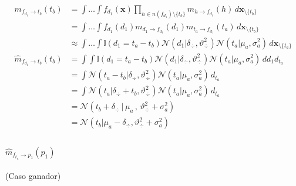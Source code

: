 \documentclass[11pt,twoside,spanish]{report} %
\begin{document}
\begin{equation}\label{eq:^m_fd_tb}
	\begin{split}
		m_{f_{d_1} \rightarrow t_b}(t_b) & = \int \dots \int f_{d_1}(\textbf{x}) \prod_{h \in n(f_{d_1}) \setminus \{t_b\} } m_{h \rightarrow f_{d_1}}(h) \, d\textbf{x}_{\setminus \{t_b\}} \\
		& = \int \dots \int f_{d_1}(d_1)  m_{d_1 \rightarrow f_{d_1}}(d_1) m_{t_a \rightarrow f_{d_1}}(t_a) \, d\textbf{x}_{\setminus \{t_b\}} \\
		&\approx  \int \dots \int \mathbb{I}(d_1 = t_a - t_b) \mathcal{N}(d_1 | \delta_{\div}, \vartheta_{\div}^2) \mathcal{N}(t_a | \mu_a , \sigma_a^2 )  \, d\textbf{x}_{\setminus \{t_a\} } \\
		\widehat{m}_{f_{d_1} \rightarrow t_b}(t_b)  & = \int \int \mathbb{I}(d_1 = t_a - t_b) \mathcal{N}(d_1 | \delta_{\div}, \vartheta_{\div}^2) \mathcal{N}(t_a | \mu_a , \sigma_a^2 )  \, d{d_1} d_{t_a} \\
		& =\int  \mathcal{N}(t_a - t_b | \delta_{\div}, \vartheta_{\div}^2) \mathcal{N}(t_a | \mu_a , \sigma_a^2 )  \, d_{t_a} \\
		& = \int  \mathcal{N}( t_a | \delta_{\div} + t_b, \vartheta_{\div}^2) \mathcal{N}(t_a | \mu_a , \sigma_a^2 )  \, d_{t_a} \\
		& = \mathcal{N}(t_b + \delta_{\div} \, | \, \mu_a \, , \, \vartheta_{\div}^2 + \sigma_a^2) \\
		& = \mathcal{N}(t_b | \mu_a - \delta_{\div}  ,  \vartheta_{\div}^2 + \sigma_a^2) \\
	\end{split}
\end{equation}

\paragraph{$\widehat{m}_{f_{t_a} \rightarrow p_1}(p_1)$} (Caso ganador)
\end{document}
